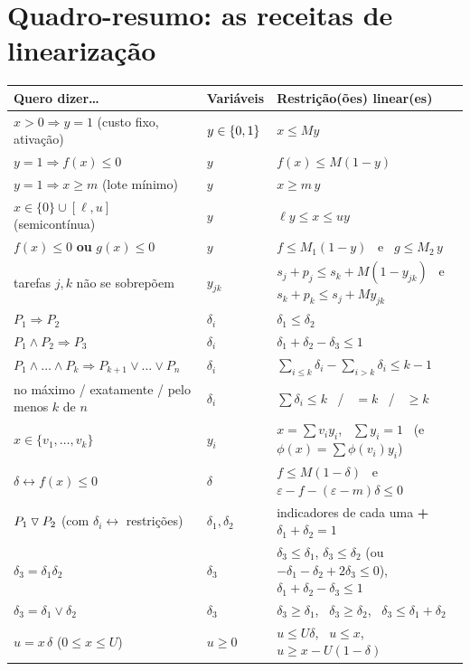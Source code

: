 \chapter{Quadro-resumo: as receitas de linearização}
\label{cap:resumo}

\begin{center}
\small
\begin{tabularx}{\linewidth}{>{\raggedright\arraybackslash}p{4.6cm}l>{\raggedright\arraybackslash}X}
\toprule
Quero dizer\ldots & Variáveis & Restrição(ões) linear(es)\\
\midrule
$x>0\Rightarrow y=1$ (custo fixo, ativação) & $y\in\{0,1\}$ & $x\le My$\\
$y=1\Rightarrow f(x)\le0$ & $y$ & $f(x)\le M(1-y)$\\
$y=1\Rightarrow x\ge m$ (lote mínimo) & $y$ & $x\ge m\,y$\\
$x\in\{0\}\cup[\ell,u]$ (semicontínua) & $y$ & $\ell y\le x\le uy$\\
$f(x)\le0$ \textbf{ou} $g(x)\le0$ & $y$ & $f\le M_1(1-y)$ \ e \ $g\le M_2\,y$\\
tarefas $j,k$ não se sobrepõem & $y_{jk}$ & $s_j+p_j\le s_k+M(1-y_{jk})$ \ e \ $s_k+p_k\le s_j+My_{jk}$\\
$P_1\Rightarrow P_2$ & $\delta_i$ & $\delta_1\le\delta_2$\\
$P_1\wedge P_2\Rightarrow P_3$ & $\delta_i$ & $\delta_1+\delta_2-\delta_3\le1$\\
$P_1\wedge\dots\wedge P_k\Rightarrow P_{k+1}\vee\dots\vee P_n$ & $\delta_i$ & $\sum_{i\le k}\delta_i-\sum_{i>k}\delta_i\le k-1$\\
no máximo / exatamente / pelo menos $k$ de $n$ & $\delta_i$ & $\sum\delta_i\le k$ \ / \ $=k$ \ / \ $\ge k$\\
$x\in\{v_1,\dots,v_k\}$ & $y_i$ & $x=\sum v_iy_i$, \ $\sum y_i=1$ \ (e $\phi(x)=\sum\phi(v_i)y_i$)\\
$\delta\leftrightarrow f(x)\le0$ & $\delta$ & $f\le M(1-\delta)$ \ e \ $\varepsilon-f-(\varepsilon-m)\delta\le0$\\
$P_1\mathbin{\triangledown} P_2$ (com $\delta_i\leftrightarrow$ restrições) & $\delta_1,\delta_2$ & indicadores de cada uma \textbf{+} $\delta_1+\delta_2=1$\\
$\delta_3=\delta_1\delta_2$ & $\delta_3$ & $\delta_3\le\delta_1$, $\delta_3\le\delta_2$ (ou $-\delta_1-\delta_2+2\delta_3\le0$), $\delta_1+\delta_2-\delta_3\le1$\\
$\delta_3=\delta_1\vee\delta_2$ & $\delta_3$ & $\delta_3\ge\delta_1$, \ $\delta_3\ge\delta_2$, \ $\delta_3\le\delta_1+\delta_2$\\
$u=x\,\delta$ ($0\le x\le U$) & $u\ge0$ & $u\le U\delta$, \ $u\le x$, \ $u\ge x-U(1-\delta)$\\
\bottomrule
\end{tabularx}
\end{center}

